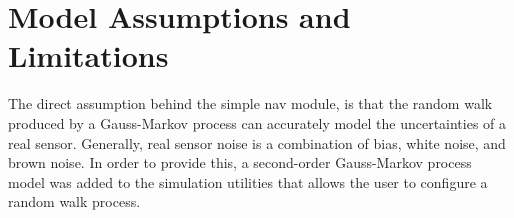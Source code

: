 \section{Model Assumptions and Limitations}

The direct assumption behind the simple nav module, is that the random walk produced by a Gauss-Markov process can accurately model the uncertainties of a real sensor. 
Generally, real sensor noise is a combination of bias, white noise, 
and brown noise.  In order to provide this, a second-order 
Gauss-Markov process model was added to the simulation utilities that allows 
the user to configure a random walk process. 